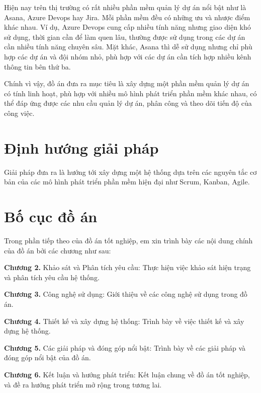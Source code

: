 \documentclass[../DoAn.tex]{subfiles}
\begin{document}
Hiện nay trên thị trường có rất nhiều phần mềm quản lý dự án nổi bật như là Asana, Azure Devops hay Jira. Mỗi phần mềm đều có những ưu và nhược điểm khác nhau.
Ví dụ, Azure Devops cung cấp nhiều tính năng nhưng giao diện khó sử dụng, thời gian cần để làm quen lâu, thường được sử dụng trong các dự án cần nhiều tính năng chuyên sâu.
Mặt khác, Asana thì dễ sử dụng nhưng chỉ phù hợp các dự án và đội nhóm nhỏ, phù hợp với các dự án cần tích hợp nhiều kênh thông tin bên thứ ba.

Chính vì vậy, đồ án đưa ra mục tiêu là xây dựng một phần mềm quản lý dự án có tính linh hoạt, phù hợp với nhiều mô hình phát triển phần mềm khác nhau, có thể đáp ứng được các nhu cầu quản lý dự án,
phân công và theo dõi tiến độ của công việc.

\section{Định hướng giải pháp}
\label{section:1.3}

Giải pháp đưa ra là hướng tới xây dựng một hệ thống dựa trên các nguyên tắc cơ bản của các mô hình phát triển phần mềm hiện đại như Scrum, Kanban, Agile.

\section{Bố cục đồ án}
\label{section:1.4}

Trong phần tiếp theo của đồ án tốt nghiệp, em xin trình bày các nội dung chính của đồ án bởi các chương như sau:

\textbf{Chương 2.} Khảo sát và Phân tích yêu cầu: Thực hiện việc khảo sát hiện trạng và phân tích yêu cầu hệ thống.

\textbf{Chương 3.} Công nghệ sử dụng: Giới thiệu về các công nghệ sử dụng trong đồ án.

\textbf{Chương 4.} Thiết kế và xây dựng hệ thống: Trình bày về việc thiết kế và xây dựng hệ thống.

\textbf{Chương 5.} Các giải pháp và đóng góp nổi bật: Trình bày về các giải pháp và đóng góp nổi bật của đồ án.

\textbf{Chương 6.} Kết luận và hướng phát triển: Kết luận chung về đồ án tốt nghiệp, và đề ra hướng phát triển mở rộng trong tương lai.
\end{document}
